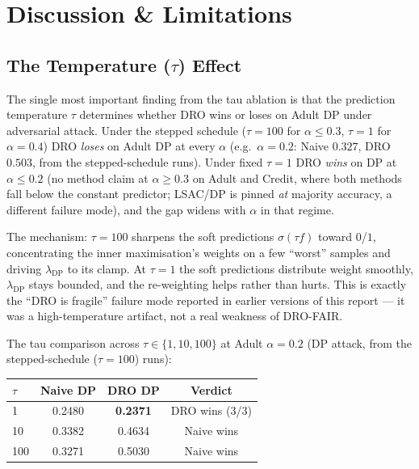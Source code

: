\documentclass[11pt,a4paper]{article}
\newcommand{\lDP}{\lambda_{\mathrm{DP}}}
\begin{document}
\section{Discussion \& Limitations}
\label{sec:discussion}

\subsection{The Temperature ($\tau$) Effect}

The single most important finding from the tau ablation is that the
prediction temperature $\tau$ determines whether DRO wins or loses on
Adult DP under adversarial attack.  Under the stepped schedule
($\tau{=}100$ for $\alpha{\le}0.3$, $\tau{=}1$ for $\alpha{=}0.4$)
DRO \emph{loses} on Adult DP at every $\alpha$ (e.g.\ $\alpha{=}0.2$:
Naive $0.327$, DRO $0.503$, from the stepped-schedule runs).  Under fixed $\tau{=}1$
DRO \emph{wins} on DP at $\alpha\le0.2$ (no method claim at
$\alpha\ge0.3$ on Adult and Credit, where both methods fall below the
constant predictor; LSAC/DP is pinned \emph{at} majority accuracy, a
different failure mode),
and the gap widens with $\alpha$ in that regime.

The mechanism: $\tau{=}100$ sharpens the soft predictions $\sigma(\tau f)$
toward $0$/$1$, concentrating the inner maximisation's weights on a few
``worst'' samples and driving $\lDP$ to its clamp.  At $\tau{=}1$ the
soft predictions distribute weight smoothly, $\lDP$ stays bounded, and
the re-weighting helps rather than hurts.  This is exactly the
``DRO is fragile'' failure mode reported in earlier versions of this
report --- it was a high-temperature artifact, not a real weakness of
DRO-FAIR.

The tau comparison across $\tau{\in}\{1,10,100\}$ at Adult $\alpha{=}0.2$
(DP attack, from the stepped-schedule ($\tau{=}100$) runs):
\begin{center}
\begin{tabular}{lccc}
\toprule
$\tau$ & Naive DP & DRO DP & Verdict \\
\midrule
1   & 0.2480 & \cellcolor{wingreen}\textbf{0.2371} & DRO wins (3/3) \\
10  & 0.3382 & \cellcolor{lossred}0.4634            & Naive wins \\
100 & 0.3271 & \cellcolor{lossred}0.5030            & Naive wins \\
\bottomrule
\end{tabular}
\end{center}
\end{document}
